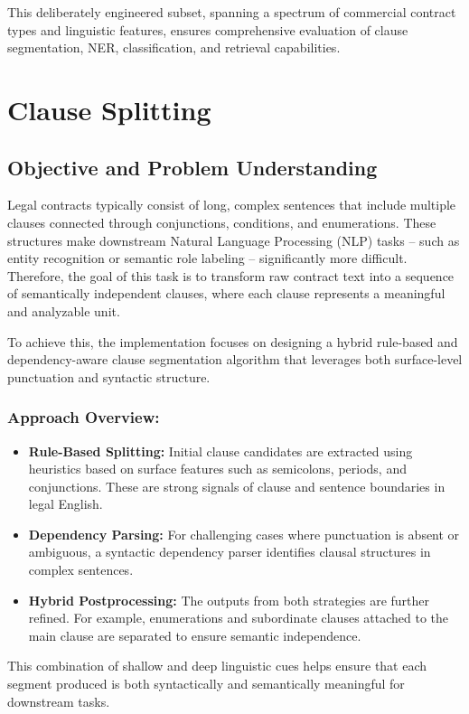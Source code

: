 \documentclass[twoside,final]{hcmut-report}
\begin{document}
This deliberately engineered subset, spanning a spectrum of commercial contract types and linguistic features, ensures comprehensive evaluation of clause segmentation, NER, classification, and retrieval capabilities.

\section{Clause Splitting}
\label{task_1.1}
\subsection{Objective and Problem Understanding}
Legal contracts typically consist of long, complex sentences that include multiple clauses connected through conjunctions, conditions, and enumerations. These structures make downstream Natural Language Processing (NLP) tasks -- such as entity recognition or semantic role labeling -- significantly more difficult. Therefore, the goal of this task is to transform raw contract text into a sequence of semantically independent clauses, where each clause represents a meaningful and analyzable unit.

\medskip

To achieve this, the implementation focuses on designing a hybrid rule-based and dependency-aware clause segmentation algorithm that leverages both surface-level punctuation and syntactic structure.

\subsubsection*{Approach Overview:}
\begin{itemize}
  \item \textbf{Rule-Based Splitting:}
        Initial clause candidates are extracted using heuristics based on surface features such as semicolons, periods, and conjunctions. These are strong signals of clause and sentence boundaries in legal English.
  \item \textbf{Dependency Parsing:}
        For challenging cases where punctuation is absent or ambiguous, a syntactic dependency parser identifies clausal structures in complex sentences.
  \item \textbf{Hybrid Postprocessing:}
        The outputs from both strategies are further refined. For example, enumerations and subordinate clauses attached to the main clause are separated to ensure semantic independence.
\end{itemize}
This combination of shallow and deep linguistic cues helps ensure that each segment produced is both syntactically and semantically meaningful for downstream tasks.
\end{document}
